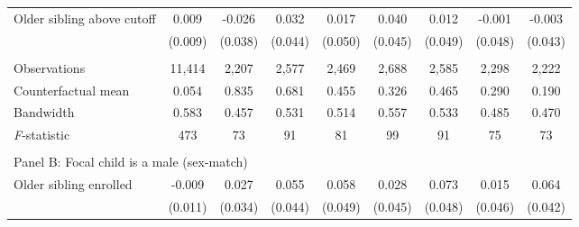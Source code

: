 \begin{table}[!htbp]
{{\begin{tabular}{lcccccccc}
Older sibling above cutoff&       0.009   &      -0.026   &       0.032   &       0.017   &       0.040   &       0.012   &      -0.001   &      -0.003   \\
                    &     (0.009)   &     (0.038)   &     (0.044)   &     (0.050)   &     (0.045)   &     (0.049)   &     (0.048)   &     (0.043)   \\
                    &               &               &               &               &               &               &               &               \\
Observations        &      11,414   &       2,207   &       2,577   &       2,469   &       2,688   &       2,585   &       2,298   &       2,222   \\
Counterfactual mean &       0.054   &       0.835   &       0.681   &       0.455   &       0.326   &       0.465   &       0.290   &       0.190   \\
Bandwidth           &       0.583   &       0.457   &       0.531   &       0.514   &       0.557   &       0.533   &       0.485   &       0.470   \\
\textit{F}-statistic&         473   &          73   &          91   &          81   &          99   &          91   &          75   &          73   \\
 
&  &  &  &  \\
\multicolumn{10}{l}{Panel B: Focal child is a male (sex-match)} \\
Older sibling enrolled&      -0.009   &       0.027   &       0.055   &       0.058   &       0.028   &       0.073   &       0.015   &       0.064   \\
                    &     (0.011)   &     (0.034)   &     (0.044)   &     (0.049)   &     (0.045)   &     (0.048)   &     (0.046)   &     (0.042)   \\
 

\end{tabular}}}
\end{table}
